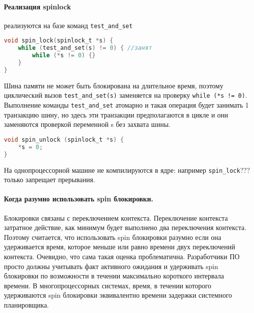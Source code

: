\paragraph{Реализация spinlock}

реализуются на базе команд \verb|test_and_set|

\begin{lstlisting}[language=c, label=impl_spin_lock, caption=Реализация spin\_lock]
void spin_lock(spinlock_t *s) {
	while (test_and_set(s) != 0) { //занят
		while (*s != 0) {}
	}
}
\end{lstlisting}

Шина памяти не может быть блокирована на длительное время, поэтому циклический вызов \verb|test_and_set(s)| заменяется на проверку \verb|while (*s != 0)|. Выполнение команды \verb|test_and_set| атомарно и такая операция будет занимать 1 транзакцию шину, но здесь эти транзакции предполагаются в цикле и они заменяются проверкой переменной s без захвата шины. 

\begin{lstlisting}[language=c, label=impl_spin_unlock, caption=Реализация spin\_unlock]
void spin_unlock (spinlock_t *s) {
	*s = 0;
}
\end{lstlisting}

На однопроцессорной машине не компилируются в ядре: например \verb|spin_lock|??? только запрещает прерывания. 

\paragraph{Когда разумно использовать spin блокировки.}

Блокировки связаны с переключением контекста. Переключение контекста затратное действие, как минимум будет выполнено два переключения контекста. Поэтому считается, что использовать spin блокировки разумно если она удерживается время, которое меньше или равно времени двух переключений контекста. Очевидно, что сама такая оценка проблематична.
Разработчики ПО просто должны учитывать факт активного ожидания и удерживать spin блокировки по возможности в течении максимально короткого интервала времени. В многопроцессорных системах, время, в течении которого удерживаются spin блокировки эквивалентно времени задержки системного планировщика.

